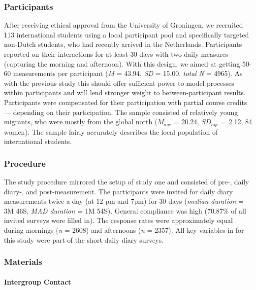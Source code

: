 \subsubsection{Participants}

After receiving ethical approval from the University of Groningen, we
recruited 113 international students using a local participant pool and
specifically targeted non-Dutch students, who had recently arrived in
the Netherlands. Participants reported on their interactions for at
least 30 days with two daily measures (capturing the morning and
afternoon). With this design, we aimed at getting 50-60 measurements per
participant (\textit{M} = 43.94, \textit{SD} = 15.00, \textit{total N} =
4965). As with the previous study this should offer sufficient power to
model processes within participants and will lend stronger weight to
between-participant results. Participants were compensated for their
participation with partial course credits --- depending on their
participation. The sample consisted of relatively young migrants, who
were mostly from the global north (\(M_{age}\) = 20.24, \(SD_{age}\) =
2.12, 84 women). The sample fairly accurately describes the local
population of international students.

\subsubsection{Procedure}

The study procedure mirrored the setup of study one and consisted of
pre-, daily diary-, and post-measurement. The participants were invited
for daily diary measurements twice a day (at 12 pm and 7pm) for 30 days
(\textit{median duration} = 3M 46S, \textit{MAD duration} = 1M 54S).
General compliance was high (70.87\% of all invited surveys were filled
in). The response rates were approximately equal during mornings
(\textit{n} = 2608) and afternoons (\textit{n} = 2357). All key
variables in for this study were part of the short daily diary surveys.

\subsubsection{Materials}

\paragraph{Intergroup Contact}

